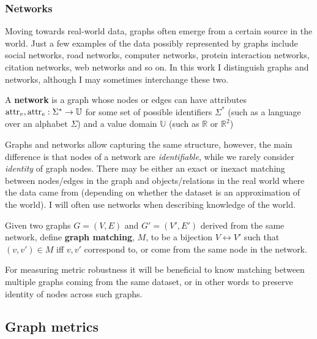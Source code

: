 \subsubsection{Networks}

Moving towards real-world data, graphs often emerge from a certain source in the world.
Just a few examples of the data possibly represented by graphs include social networks, road networks, computer networks, protein interaction networks, citation networks, web networks and so on.
In this work I distinguish graphs and networks, although I may sometimes interchange these two.

\begin{definition}[Network]
    A \textbf{network} is a graph whose nodes or edges can have attributes $\textnormal{attr}_v, \textnormal{attr}_e : \Sigma^* \rightarrow \mathbb{U}$ for some set of possible identifiers $\Sigma^*$ (such as a language over an alphabet $\Sigma$) and a value domain $\mathbb{U}$ (such as $\mathbb{R}$ or $\mathbb{R}^2$)
\end{definition}

Graphs and networks allow capturing the same structure, however, the main difference is that nodes of a network are \textit{identifiable}, while we rarely consider \textit{identity} of graph nodes.
There may be either an exact or inexact matching between nodes/edges in the graph and objects/relations in the real world where the data came from (depending on whether the dataset is an approximation of the world).
I will often use networks when describing knowledge of the world.

\begin{definition}
    Given two graphs $G = (V, E)$ and $G' = (V', E')$ derived from the same network, define \textbf{graph matching}, $M$, to be a bijection $V \leftrightarrow V'$ such that $(v, v') \in M$ iff $v, v'$ correspond to, or come from the same node in the network.
\end{definition}

For measuring metric robustness it will be beneficial to know matching between multiple graphs coming from the same dataset, or in other words to preserve identity of nodes across such graphs.

\subsection{Graph metrics}

